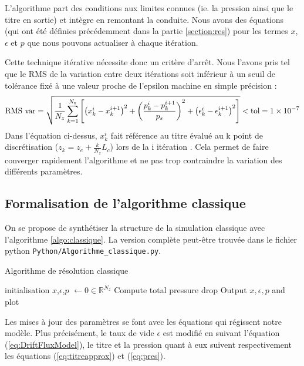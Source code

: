 L'algorithme part des conditions aux limites connues (ie. la pression ainsi que le titre en sortie) et intègre en \og remontant \fg{} la conduite. Nous avons des équations (qui ont été définies précédemment dans la partie \ref{section:res}) pour les termes $x$, $\epsilon$ et $p$ que nous pouvons actualiser à chaque itération.\\ \par
Cette technique itérative nécessite donc un critère d'arrêt. Nous l'avons pris tel que le RMS de la variation entre deux itérations soit inférieur à un seuil de tolérance fixé à une valeur proche de l'epsilon machine en simple précision :
\begin{equation}
    \textnormal{RMS var} = \sqrt{\frac{1}{N_z}\sum_{k=1}^{N_z}\left[\left(x^{i}_k-x^{i+1}_k\right)^2 + \left(\frac{p^i_k- p^{i+1}_k}{p_s} \right)^2 + \left(\epsilon^i_k - \epsilon^{i+1}_k \right)^2\right]} <  \textnormal{tol} =\num{1e-7}
\end{equation}
Dans l'équation ci-dessus, $x^i_k$ fait référence au titre évalué au k point de discrétisation ($z_k = z_e + \frac{k}{N_z}L_c$) lors de la i itération . Cela permet de faire converger rapidement l'algorithme et ne pas trop contraindre la variation des différents paramètres.


\subsection{Formalisation de l'algorithme classique}

On se propose de synthétiser la structure de la simulation classique avec l'algorithme \ref{algo:classique}. La version complète peut-être trouvée dans le fichier python \verb|Python/Algorithme_classique.py|.

\begin{algorithm}
\label{algo:classique}
\caption{Algorithme de résolution classique}
\SetAlgoLined
{}
initialisation\;
$x$,$\epsilon$,$p$ $\leftarrow 0 \in \mathbb{R}^{N_z}$ \;
Compute total pressure drop\;
Output $x,\epsilon,p$ and plot\;
\end{algorithm}
Les mises à jour des paramètres se font avec les équations qui régissent notre modèle. Plus précisément, le taux de vide $\epsilon$ est modifié en suivant l'équation (\ref{eq:DriftFluxModel}), le titre et la pression quant à eux suivent respectivement les équations (\ref{eq:titreapprox}) et (\ref{eq:pres}).

